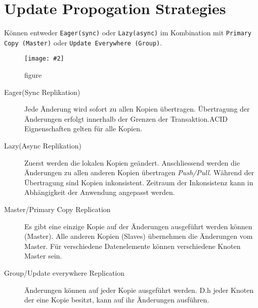 \documentclass[a4paper,10pt,titlepage=false]{scrreprt}
\newcommand{\pic}[2][figure]{\begin{figure}[h]
 \centering
 \texttt{[image: \#2]}
 \caption{#1}
\end{figure}
}
\begin{document}
\section{Update Propogation Strategies} %
\label{sec:update_propogation_strategies}
Können entweder \texttt{Eager(sync)} oder \texttt{Lazy(async)} im Kombination mit \texttt{Primary Copy (Master)} oder \texttt{Update Everywhere (Group)}.
\pic{ups.png}
\begin{description}
  \item[Eager(Sync Replikation)] Jede Änderung wird sofort zu allen Kopien übertragen. Übertragung der Änderungen erfolgt innerhalb der Grenzen der Transaktion.ACID Eignenschaften gelten für alle Kopien.
  \item[Lazy(Async Replikation) ] Zuerst werden die lokalen Kopien geändert. Anschliessend werden die Änderungen zu allen anderen Kopien übertragen \textit{Push/Pull}. Während der Übertragung sind Kopien inkonsistent. Zeitraum der Inkonsistenz kann in Abhängigkeit der Anwendung angepasst werden.
  \item[Master/Primary Copy Replication] Es gibt eine einzige Kopie auf der Änderungen ausgeführt werden können (Master). Alle anderen Kopien (Slaves) übernehmen die Änderungen vom Master. Für verschiedene Datenelemente können verschiedene Knoten Master sein.
  \item[Group/Update everywhere Replication] Änderungen können auf jeder Kopie ausgeführt werden. D.h jeder Knoten der eine Kopie besitzt, kann auf ihr Änderungen ausführen.

\end{description}
\end{document}
